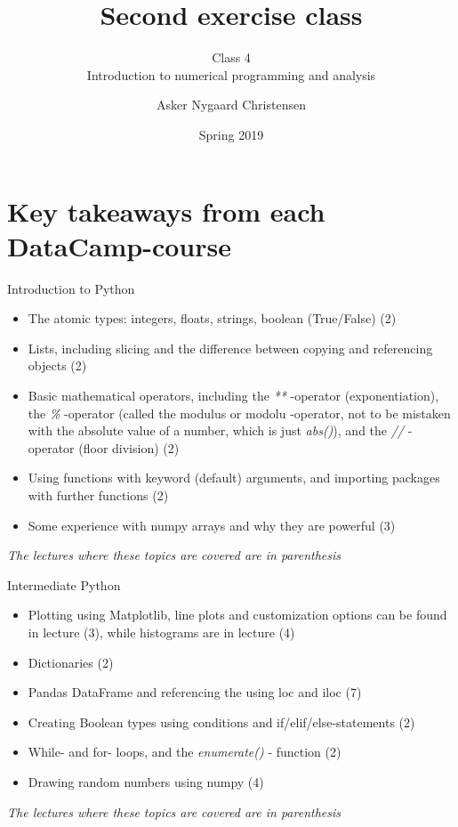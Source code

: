 \documentclass[10pt,danish,t,10pt]{beamer}
\title{Second exercise class \vspace{-2mm}}
\subtitle{Class 4 \\Introduction to numerical programming and analysis \vspace{-4mm} }
\author{Asker Nygaard Christensen}
\date{Spring 2019}
\newcommand{\code}[1]{\textit{#1}} %
\begin{document}
\section{Key takeaways from each DataCamp-course}

\begin{frame}{Introduction to Python}
\begin{itemize}
    \item The atomic types: integers, floats, strings, boolean (True/False) (2)  
    \item Lists, including slicing and the difference between copying and referencing objects (2)
    \item Basic mathematical operators, including the \code{**} -operator (exponentiation), the \code{\%} -operator (called the modulus or modolu -operator, not to be mistaken with the absolute value of a number, which is just \code{abs()}), and the \code{//} -operator (floor division) (2)
    \item Using functions with keyword (default) arguments, and importing packages with further functions (2)
    \item Some experience with numpy arrays and why they are powerful (3)
\end{itemize}
\mbox{}
\vfill
\textit{The lectures where these topics are covered are in parenthesis} 

\end{frame}

\begin{frame}{Intermediate Python}
    \begin{itemize}
        \item Plotting using Matplotlib, line plots and customization options can be found in lecture (3), while histograms are in lecture (4)
        \item Dictionaries (2)
        \item Pandas DataFrame and referencing the using loc and iloc (7)
        \item Creating Boolean types using conditions and if/elif/else-statements (2)
        \item While- and for- loops, and the \code{enumerate()} - function (2)
        \item Drawing random numbers using numpy (4)
    \end{itemize} 
    \mbox{}
    \vfill
    \textit{The lectures where these topics are covered are in parenthesis} 
\end{frame}
\end{document}
